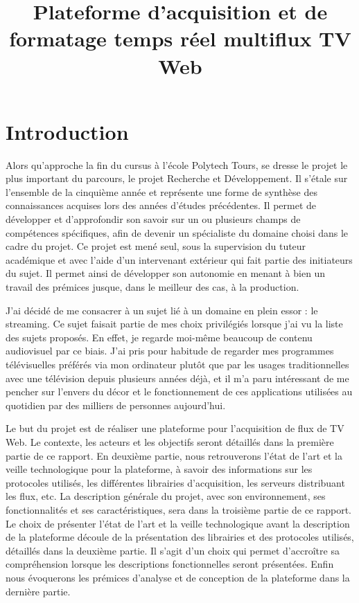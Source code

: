 \documentclass{polytech/polytech}
\title{Plateforme d'acquisition et de formatage temps réel multiflux TV Web}
\begin{document}
\chapter*{Introduction}


Alors qu’approche la fin du cursus à l’école Polytech Tours, se dresse le projet le plus important du parcours, le projet Recherche et Développement. Il s’étale sur l’ensemble de la cinquième année et représente une forme de synthèse des connaissances acquises lors des années d’études précédentes. Il permet de développer et d’approfondir son savoir sur un ou plusieurs champs de compétences spécifiques, afin de devenir un spécialiste du domaine choisi dans le cadre du projet. Ce projet est mené seul, sous la supervision du tuteur académique et avec l’aide d’un intervenant extérieur qui fait partie des initiateurs du sujet. Il permet ainsi de développer son autonomie en menant à bien un travail des prémices jusque, dans le meilleur des cas, à la production.

J’ai décidé de me consacrer à un sujet lié à un domaine en plein essor : le streaming. Ce sujet faisait partie de mes choix privilégiés lorsque j’ai vu la liste des sujets proposés. En effet, je regarde moi-même beaucoup de contenu audiovisuel par ce biais. J’ai pris pour habitude de regarder mes programmes télévisuelles préférés via mon ordinateur plutôt que par les usages traditionnelles avec une télévision depuis plusieurs années déjà, et il m’a paru intéressant de me pencher sur l’envers du décor et le fonctionnement de ces applications utilisées au quotidien par des milliers de personnes aujourd’hui.

Le but du projet est de réaliser une plateforme pour l’acquisition de flux de TV Web. Le contexte, les acteurs et les objectifs seront détaillés dans la première partie de ce rapport. En deuxième partie, nous retrouverons l’état de l’art et la veille technologique pour la plateforme, à savoir des informations sur les protocoles utilisés, les différentes librairies d’acquisition, les serveurs distribuant les flux, etc. La description générale du projet, avec son environnement, ses fonctionnalités et ses caractéristiques, sera dans la troisième partie de ce rapport. Le choix de présenter l’état de l’art et la veille technologique avant la description de la plateforme découle de la présentation des librairies et des protocoles utilisés, détaillés dans la deuxième partie. Il s’agit d’un choix qui permet d’accroître sa compréhension lorsque les descriptions fonctionnelles seront présentées. Enfin nous évoquerons les prémices d’analyse et de conception de la plateforme dans la dernière partie.
\end{document}
